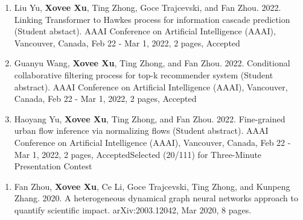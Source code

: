 
\begin{enumerate}[resume]
    \item Liu Yu, \textbf{Xovee Xu}, Ting Zhong, Goce Trajcevski, and Fan Zhou. 2022. Linking Transformer to Hawkes process for information cascade prediction (Student abstact). AAAI Conference on Artificial Intelligence (AAAI), Vancouver, Canada, Feb 22 - Mar 1, 2022, 2 pages, Accepted
    \item Guanyu Wang, \textbf{Xovee Xu}, Ting Zhong, and Fan Zhou. 2022. Conditional collaborative filtering process for top-k recommender system (Student abstract). AAAI Conference on Artificial Intelligence (AAAI), Vancouver, Canada, Feb 22 - Mar 1, 2022, 2 pages, Accepted
    \item Haoyang Yu, \textbf{Xovee Xu}, Ting Zhong, and Fan Zhou. 2022. Fine-grained urban flow inference via normalizing flows (Student abstract). AAAI Conference on Artificial Intelligence (AAAI), Vancouver, Canada, Feb 22 - Mar 1, 2022, 2 pages, Accepted\newline Selected (20/111) for Three-Minute Presentation Contest
\end{enumerate}


\begin{enumerate}[resume]
    \item Fan Zhou, \textbf{Xovee Xu}, Ce Li, Goce Trajcevski, Ting Zhong, and Kunpeng Zhang. 2020. A heterogeneous dynamical graph neural networks approach to quantify scientific impact. arXiv:2003.12042, Mar 2020, 8 pages. 
\end{enumerate}



